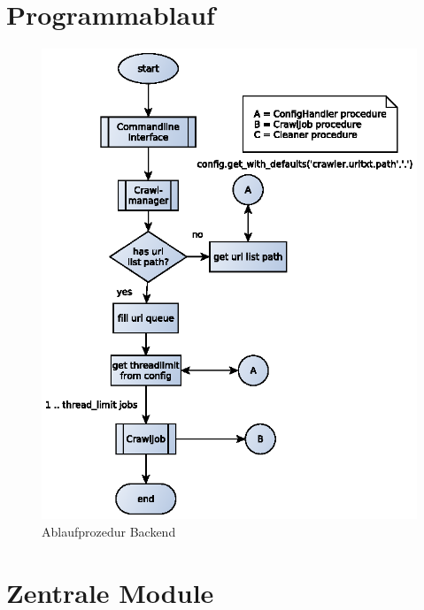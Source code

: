 \section{Programmablauf} 
\label{sec:programmablauf}
\begin{figure}[h]
\centering
\label{dia:design:backend:overview}
\includegraphics[width=\textwidth]{design/backend/gfx/backend_procedure.eps}
\caption{Ablaufprozedur Backend}
\end{figure}



\section{Zentrale Module} 
\label{sec:zentrale_module}

